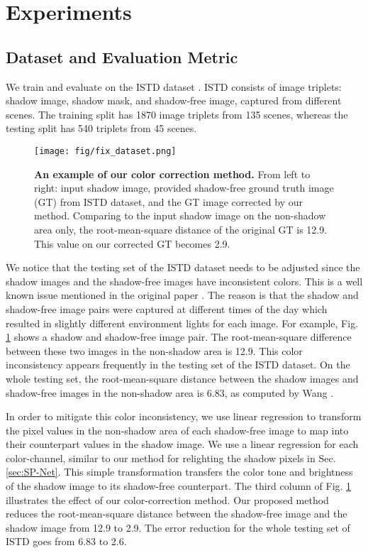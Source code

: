 \section{Experiments}

\subsection{Dataset and Evaluation Metric}
We train and evaluate on the ISTD dataset \cite{Wang_2018_CVPR}. ISTD consists of image triplets: shadow image, shadow mask, and shadow-free image, captured from different scenes. The training split has 1870 image triplets from 135 scenes, whereas the testing split has 540 triplets from 45 scenes.


\def\subboxsize{0.3\subFigSzab}
\begin{figure}[]
 \centering
    \texttt{[image: fig/fix\_dataset.png]}
     \makebox[\subboxsize]{Shad. Image}
    \makebox[\subboxsize]{Original GT}
    \makebox[\subboxsize]{Corrected GT}
    \caption{\textbf{An example of our color correction method.} From left to right: input shadow image, provided shadow-free ground truth image (GT) from ISTD dataset, and the GT image corrected by our method. Comparing to the input shadow image on the non-shadow area only, the root-mean-square distance of the original GT is 12.9. This value on our corrected GT becomes 2.9. 
    }
    \label{fig:fix_dataset}
\end{figure}

We notice that the testing set of the  ISTD dataset needs to be adjusted since the shadow images and the shadow-free images have inconsistent colors. This is a well known issue mentioned in the original paper \cite{Wang_2018_CVPR}. The reason is that the shadow and shadow-free image pairs were captured at different times of the day which resulted in slightly different environment lights for each image.
For example, Fig. \ref{fig:fix_dataset} shows a shadow  and shadow-free image pair. The root-mean-square difference between these two images in the non-shadow area is 12.9. This color inconsistency appears frequently in the testing set of the ISTD dataset. On the whole testing set, the root-mean-square distance between the shadow images and shadow-free images in the non-shadow area is 6.83, as computed by Wang \etal \cite{Wang_2018_CVPR}. 

In order to mitigate this color inconsistency, we use linear regression to transform the pixel values  in the non-shadow area of each shadow-free image to map into  their counterpart values in the shadow image. We use a linear regression for each color-channel, similar to our method for relighting the shadow pixels in Sec. \ref{sec:SP-Net}. This simple transformation transfers the color tone and brightness of the shadow image to its shadow-free counterpart. The third column of Fig. \ref{fig:fix_dataset} illustrates the effect of our color-correction method. Our proposed method reduces the root-mean-square distance between the shadow-free image and the shadow image from 12.9 to 2.9. The error reduction for the whole testing set of ISTD goes from 6.83 to 2.6. 

